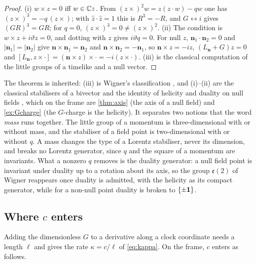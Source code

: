 \begin{proof}
(i) $w\times z=0$ iff $w\in\mathbb{C} z$. From $(z\times)^2w=z(z\cdot w)-qw$ one has $(z\times)^3=-q\,(z\times)$; with $\hat z\cdot\hat z=1$ this is $R^3=-R$, and
$G\leftrightarrow i$ gives $(GR)^3=GR$; for $q=0$, $(z\times)^3=0\neq(z\times)^2$. (ii) The condition is $w\times z+i\vartheta z=0$, and dotting with $z$ gives
$i\vartheta q=0$. For null $z$, $\mathbf n_1\cdot\mathbf n_2=0$ and $|\mathbf n_1|=|\mathbf n_2|$ give $\mathbf n\times\mathbf n_1=\mathbf n_2$ and
$\mathbf n\times\mathbf n_2=-\mathbf n_1$, so $\mathbf n\times z=-iz$, $(L_{\mathbf n}+G)z=0$ and $[L_{\mathbf n},z\times\cdot]=(\mathbf n\times z)\times\cdot=-i(z\times\cdot)$.
(iii) is the classical computation of the little groups of a timelike and a null vector.
\end{proof}

The theorem is inherited: (iii) is Wigner's classification \cite{Wigner39,WeinbergQFT}, and (i)--(ii) are the classical stabilisers of a
bivector and the identity of helicity and duality on null fields \cite{PenroseRindler84,Calkin65}, which on the frame are \cref{thm:axis} (the
axis of a null field) and \cref{ex:Gcharge} (the $G$-charge is the helicity). It separates two notions that the word \emph{mass} runs together.
The little group of a momentum is three-dimensional with or without mass, and the stabiliser of a field point is two-dimensional with or without
$q$. A mass changes the type of a Lorentz stabiliser, never its dimension, and breaks no Lorentz generator, since $q$ and the square of a momentum
are invariants. What a nonzero $q$ removes is the duality generator: a null field point is invariant under duality up to a rotation about its
axis, so the group $\mathfrak e(2)$ of Wigner reappears once duality is admitted, with the helicity as its compact generator, while for a non-null
point duality is broken to $\{\pm\mathbf 1\}$.

\subsection{\texorpdfstring{Where $c$ enters}{Where c enters}}
\label{sec:energy-c}

Adding the dimensionless $G$ to a derivative along a clock coordinate needs a length $\ell$ and gives the rate $\kappa=c/\ell$ of
\eqref{eq:kappa}. On the frame, $c$ enters as follows.

